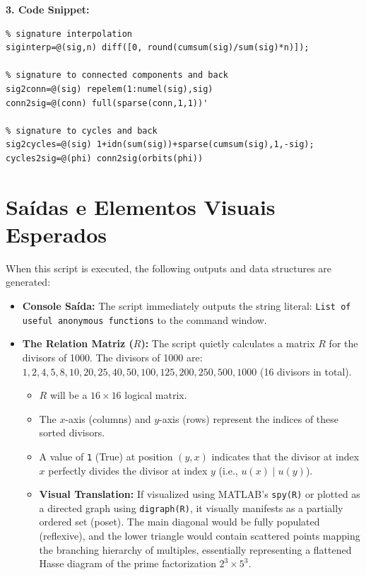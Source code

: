 \textbf{3. Code Snippet:}
\begin{lstlisting}
% signature interpolation
siginterp=@(sig,n) diff([0, round(cumsum(sig)/sum(sig)*n)]);

% signature to connected components and back
sig2conn=@(sig) repelem(1:numel(sig),sig)
conn2sig=@(conn) full(sparse(conn,1,1))' 

% signature to cycles and back
sig2cycles=@(sig) 1+idn(sum(sig))+sparse(cumsum(sig),1,-sig);
cycles2sig=@(phi) conn2sig(orbits(phi))
\end{lstlisting}

\section{Saídas e Elementos Visuais Esperados}

When this script is executed, the following outputs and data structures are generated:

\begin{itemize}
    \item \textbf{Console Saída:} The script immediately outputs the string literal: \texttt{List of useful anonymous functions} to the command window.
    \item \textbf{The Relation Matriz ($R$):} The script quietly calculates a matrix $R$ for the divisors of 1000. The divisors of 1000 are: $1, 2, 4, 5, 8, 10, 20, 25, 40, 50, 100, 125, 200, 250, 500, 1000$ (16 divisors in total). 
    \begin{itemize}
        \item $R$ will be a $16 \times 16$ logical matrix.
        \item The $x$-axis (columns) and $y$-axis (rows) represent the indices of these sorted divisors.
        \item A value of \texttt{1} (True) at position $(y, x)$ indicates that the divisor at index $x$ perfectly divides the divisor at index $y$ (i.e., $u(x) \mid u(y)$).
        \item \textbf{Visual Translation:} If visualized using MATLAB's \texttt{spy(R)} or plotted as a directed graph using \texttt{digraph(R)}, it visually manifests as a partially ordered set (poset). The main diagonal would be fully populated (reflexive), and the lower triangle would contain scattered points mapping the branching hierarchy of multiples, essentially representing a flattened Hasse diagram of the prime factorization $2^3 \times 5^3$.
    \end{itemize}
\end{itemize}
